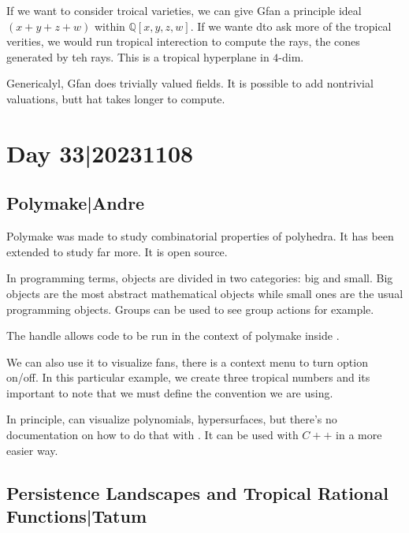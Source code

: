 \documentclass[12pt]{memoir}
\theoremstyle{definition}
\def\QQ{{\mathbb Q}}
\begin{document}
If we want to consider troical varieties, we can give Gfan a principle ideal $(x+y+z+w)$ within $\QQ[x,y,z,w]$. If we wante dto ask more of the tropical verities, we would run tropical interection to compute the rays, the cones generated by teh rays. This is a tropical hyperplane in $4$-dim.

Genericalyl, Gfan does trivially valued fields. It is possible to add nontrivial valuations, butt hat takes longer to compute.


\section{Day 33|20231108}

\subsection{Polymake|Andre}

Polymake was made to study combinatorial properties of polyhedra. It has been extended to study far more. It is open source.\par 
In programming terms, objects are divided in two categories: big and small. Big objects are the most abstract mathematical objects while small ones are the usual programming objects. Groups can be used to see group actions for example.

\begin{Ex}
    The handle  allows code to be run in the context of polymake inside .\par 
    We can also use it to visualize fans, there is a context menu to turn option on/off. In this particular example, we create three tropical numbers and its important to note that we must define the convention we are using.
\end{Ex}

In principle,  can visualize polynomials, hypersurfaces, but there's no documentation on how to do that with . It can be used with $C++$ in a more easier way.

\subsection{Persistence Landscapes and Tropical Rational Functions|Tatum}
\end{document}
